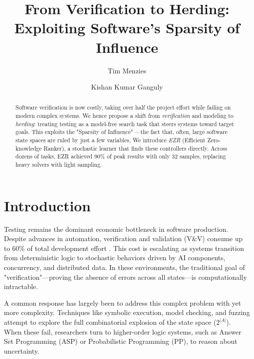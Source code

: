 \documentclass[runningheads]{llncs}
\begin{document}
 \small

\title{From Verification to Herding:\\
Exploiting Software's Sparsity of Influence}

\author{Tim Menzies \and Kishan Kumar Ganguly}

\maketitle

\begin{abstract}
Software verification is now costly, taking over half the project effort while failing on modern complex systems. We hence propose a shift from \textit{verification} and modeling to \textit{herding}: treating testing as a model-free search task that steers systems toward target goals. This exploits the "Sparsity of Influence" ---the fact that, often, large   software state spaces are ruled by just a few variables,  We introduce \textit{EZR} (Efficient Zero-knowledge Ranker), a stochastic learner that finds these controllers directly. Across dozens of tasks, EZR achieved 90\% of peak results with only 32 samples, replacing heavy solvers with light sampling.

 

\end{abstract}

\section{Introduction}
Testing remains the dominant economic bottleneck in software production. 
Despite advances in automation, verification and validation (V\&V) consume up 
to 60\% of total development effort \cite{Long24}. This cost is escalating as 
systems transition from deterministic logic to stochastic behaviors driven by 
AI components, concurrency, and distributed data. In these environments, the 
traditional goal of "verification"---proving the absence of errors across all 
states---is computationally intractable.

A common response has largely been to address this complex problem with yet more    complexity. 
Techniques like symbolic execution, model checking, and fuzzing attempt to 
explore the full combinatorial explosion of the state space ($2^{|A|}$). When 
these fail, researchers turn to higher-order logic systems, such as Answer Set 
Programming (ASP) or Probabilistic Programming (PP), to reason about uncertainty.
\end{document}
